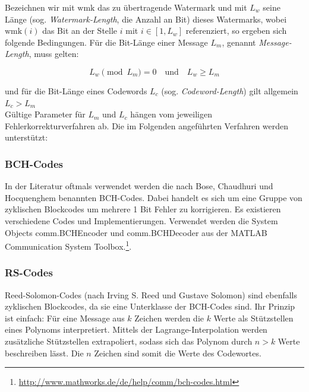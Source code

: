 Bezeichnen wir mit $\mbox{wmk}$ das zu übertragende Watermark und mit ${L}_{w}$ seine Länge (sog. \textit{Watermark-Length}, die Anzahl an Bit) dieses Watermarks, wobei $\mbox{wmk}(i)$ das Bit an der Stelle $i$ mit $i\in[1,{L}_{w}]$ referenziert, so ergeben sich folgende Bedingungen. Für die Bit-L\"ange einer Message ${L}_{m}$, genannt \textit{Message-Length}, muss gelten:

	 \begin{equation}
		 {L}_{w} \pmod{{L}_{m}} = 0 \quad\mbox{und}\quad {L}_{w}\geq{L}_{m} 		
		 \label{equ:wmkseqlength}
	 \end{equation} 

und für die Bit-Länge eines Codewords ${L}_{c}$ (sog. \textit{Codeword-Length}) gilt allgemein ${L}_{c} > {L}_{m}$
\\
Gültige Parameter für ${L}_{m}$ und ${L}_{c}$ hängen vom jeweiligen Fehlerkorrekturverfahren ab. Die im Folgenden angeführten Verfahren werden unterstützt:

\subsubsection{BCH-Codes}

In der Literatur\cite{chang2012location}\cite{huang2002blind} oftmals verwendet werden die nach Bose, Chaudhuri und Hocquenghem benannten BCH-Codes\cite{bose1960class}. Dabei handelt es sich um eine Gruppe von zyklischen Blockcodes um mehrere 1 Bit Fehler zu korrigieren. Es existieren verschiedene Codes und Implementierungen. Verwendet werden die System Objects \textsf{comm.BCHEncoder} und \textsf{comm.BCHDecoder} aus der MATLAB Communication System Toolbox.\footnote{\url{http://www.mathworks.de/de/help/comm/bch-codes.html}}.

\subsubsection{RS-Codes} 

Reed-Solomon-Codes\cite{reed1960polynomial} (nach Irving S. Reed und Gustave Solomon) sind ebenfalls zyklischen Blockcodes, da sie eine Unterklasse der BCH-Codes sind. Ihr Prinzip ist einfach: Für eine Message aus $k$ Zeichen werden die $k$ Werte als Stützstellen eines Polynoms interpretiert. Mittels der Lagrange-Interpolation werden zusätzliche Stützstellen extrapoliert, sodass sich das Polynom durch $n>k$ Werte beschreiben lässt. Die $n$ Zeichen sind somit die Werte des Codewortes.

